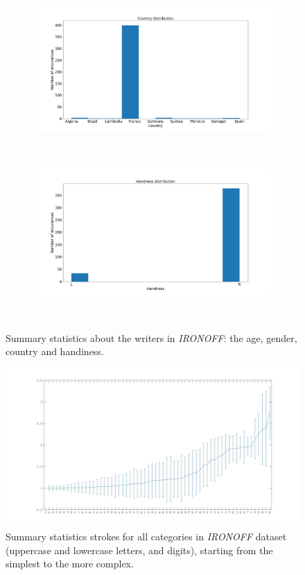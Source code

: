 \begin{figure}
\begin{subfigure}{0.45\textwidth}
        \includegraphics[scale=0.25]{images/dataset/country.png}
    \end{subfigure}
    ~
    \begin{subfigure}{0.45\textwidth}
        \includegraphics[scale=0.25]{images/dataset/handness_dist.png}
    \end{subfigure}
    ~
    \caption{Summary statistics about the writers in \textit{IRONOFF}: the age, gender, country and handiness.}
    \label{fig:ironoff_basic_stats}
\end{figure}

\begin{figure}
    \centering
    \includegraphics[scale=0.32]{images/dataset/ironoff_strokes.jpg}
    \caption{Summary statistics strokes for all categories in \textit{IRONOFF} dataset (uppercase and lowercase letters, and digits), starting from the simplest to the more complex.}
    \label{fig:ironoff_strokes}
\end{figure}

